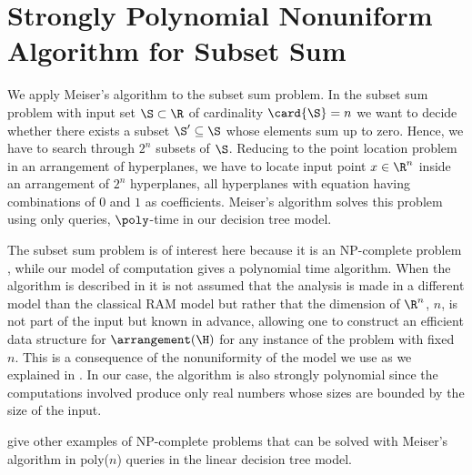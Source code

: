 \section[Strongly Polynomial Nonuniform Algorithm \dots]{Strongly Polynomial Nonuniform Algorithm for Subset Sum}

We apply Meiser's algorithm to the subset sum problem. In the subset sum
problem with input set $\S \subset \R$ of cardinality $\card{\S} = n$ we want to
decide whether there exists a subset $\S' \subseteq \S$ whose elements sum up to zero. Hence, we have
to search through $2^n$ subsets of $\S$. Reducing to the point location problem
in an arrangement of hyperplanes, we have to locate input point $x \in
\R^n$ inside an arrangement of $2^n$ hyperplanes, \ie all hyperplanes with
equation having combinations of $0$ and $1$ as coefficients. Meiser's algorithm
solves this problem using only  queries, \ie $\poly$-time
in our decision tree model.

The subset sum problem is of interest here because it is an NP-complete problem
\cite{karp:1972}, while our model of computation gives a polynomial time
algorithm. When the algorithm is described in \cite{burgisser:1997} it is not
assumed that the analysis is made in a different model than the classical
RAM model but rather that the dimension of $\R^n$, $n$, is not part of the input
but known in advance, allowing one to construct an efficient data structure for
$\arrangement(\H)$ for any instance of the problem with fixed $n$.
This is a consequence of the nonuniformity of the model we use as we explained
in . In our case, the algorithm is
also strongly polynomial since the computations involved produce only real
numbers whose sizes are bounded by the size of the input.

\citet*{meiser:1993,burgisser:1997} give other examples of
NP-complete problems that can be solved with Meiser's algorithm in poly(\(n\))
queries in the linear decision tree model.
